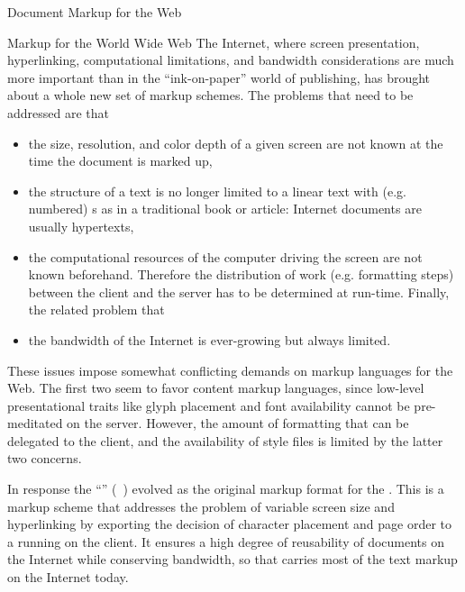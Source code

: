\begin{tchapter}[id=markup-web]{Document Markup for the Web}
\begin{tsection}[id=markup:www]{Markup for the World Wide Web}{}
The Internet, where screen presentation, hyperlinking, computational limitations,
and bandwidth considerations are much more important than in the ``ink-on-paper''
world of publishing, has brought about a whole new set of markup schemes. The
problems that need to be addressed are that
\begin{itemize}
\item the size, resolution, and color depth of a given screen are not known at the time
  the document is marked up,
\item the structure of a text is no longer limited to a linear text with (e.g.  numbered)
  {s} as in a traditional book or article: Internet documents
  are usually hypertexts,
\item the computational resources of the computer driving the screen are not known
  beforehand. Therefore the distribution of work (e.g. formatting steps) between the
  client and the server has to be determined at run-time. Finally, the related problem that
\item the bandwidth of the Internet is ever-growing but always limited.
\end{itemize}

These issues impose somewhat conflicting demands on markup languages for the Web.  The
first two seem to favor content markup languages, since low-level presentational traits
like glyph placement and font availability cannot be pre-meditated on the server. However,
the amount of formatting that can be delegated to the client, and the availability of
style files is limited by the latter two concerns.

In response the ``{}'' ({\html}~\cite{RagHor:html98})
evolved as the original markup format for the {}. This is a
markup scheme that addresses the problem of variable screen size and hyperlinking by
exporting the decision of character placement and page order to a {}
running on the client.  It ensures a high degree of reusability of documents on the
Internet while conserving bandwidth, so that {\html} carries most of the text markup on
the Internet today.


\end{tsection}
\end{tchapter}
